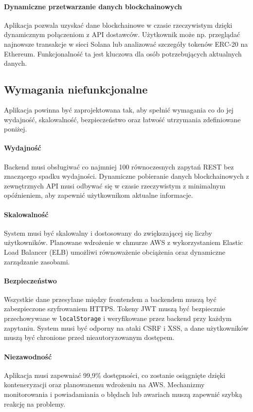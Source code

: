 \paragraph{Dynamiczne przetwarzanie danych blockchainowych}
Aplikacja pozwala uzyskać dane blockchainowe w czasie rzeczywistym dzięki dynamicznym połączeniom z API dostawców. Użytkownik może np. przeglądać najnowsze transakcje w sieci Solana lub analizować szczegóły tokenów ERC-20 na Ethereum. Funkcjonalność ta jest kluczowa dla osób potrzebujących aktualnych danych.

\subsection{Wymagania niefunkcjonalne}
Aplikacja powinna być zaprojektowana tak, aby spełnić wymagania co do jej wydajność, skalowalność, bezpieczeństwo oraz łatwość utrzymania zdefiniowane poniżej.

\paragraph{Wydajność}
Backend musi obsługiwać co najmniej 100 równoczesnych zapytań REST bez znaczącego spadku wydajności. Dynamiczne pobieranie danych blockchainowych z zewnętrznych API musi odbywać się w czasie rzeczywistym z minimalnym opóźnieniem, aby zapewnić użytkownikom aktualne informacje.

\paragraph{Skalowalność}
System musi być skalowalny i dostosowany do zwiększającej się liczby użytkowników. Planowane wdrożenie w chmurze AWS z wykorzystaniem Elastic Load Balancer (ELB) umożliwi równoważenie obciążenia oraz dynamiczne zarządzanie zasobami.

\paragraph{Bezpieczeństwo}
Wszystkie dane przesyłane między frontendem a backendem muszą być zabezpieczone szyfrowaniem HTTPS. Tokeny JWT muszą być bezpiecznie przechowywane w \texttt{localStorage} i weryfikowane przez backend przy każdym zapytaniu. System musi być odporny na ataki CSRF i XSS, a dane użytkowników muszą być chronione przed nieautoryzowanym dostępem.

\paragraph{Niezawodność}
Aplikacja musi zapewniać 99,9\% dostępności, co zostanie osiągnięte dzięki konteneryzacji oraz planowanemu wdrożeniu na AWS. Mechanizmy monitorowania i powiadamiania o błędach lub awariach muszą zapewnić szybką reakcję na problemy.

